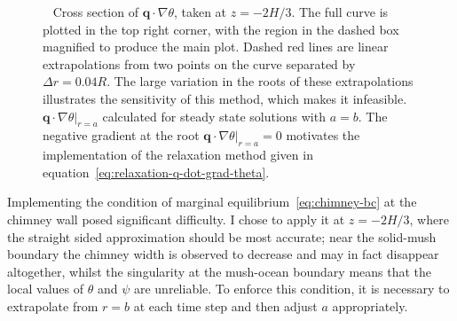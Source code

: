 \documentclass[11pt]{proc}
\begin{document}
\begin{figure}[t!]
\centering
\captionsetup[subfigure]{position=top,singlelinecheck=off,justification=raggedright, aboveskip=-12pt,belowskip=0pt}
\begin{subfigure}[t]{.54\linewidth}
       	\centering
       	 \caption{}
       	\setlength\figureheight{5cm} 
	\setlength\figurewidth{7cm}
	
       	\label{subfig:q-dot-grad-theta}
\end{subfigure}
\quad
\captionsetup[subfigure]{aboveskip=-18pt}
\begin{subfigure}[t]{.42\linewidth}
       	\centering
        	\caption{}
      	\setlength\figureheight{5cm} 
	\setlength\figurewidth{4cm}
	
    	\label{subfig:q-dot-grad-theta-root}
\end{subfigure}

\setlength{\belowcaptionskip}{-7pt} %

\caption{~ Cross section of $\mathbf{q} \cdot \nabla \theta$, taken at $z=-2H/3$. The full curve is plotted in the top right corner, with the region in the dashed box magnified to produce the main plot. Dashed red lines are linear extrapolations from two points on the curve separated by $\Delta r = 0.04R$. The large variation in the roots of these extrapolations illustrates the sensitivity of this method, which makes it infeasible.~ $ \left. \mathbf{q} \cdot \nabla \theta \right|_{r=a}$ calculated for steady state solutions with $a=b$. The negative gradient at the root $ \left. \mathbf{q} \cdot \nabla \theta \right|_{r=a} = 0$ motivates the implementation of the relaxation method given in equation~\eqref{eq:relaxation-q-dot-grad-theta}. }
\label{fig:free-boundary-method}  

\end{figure}

Implementing the condition of marginal equilibrium~\eqref{eq:chimney-bc} at the chimney wall posed significant difficulty. I chose to apply it at $z = - 2H/3$, where the straight sided approximation should be most accurate; near the solid-mush boundary the chimney width is observed to decrease and may in fact disappear altogether, whilst the singularity at the mush-ocean boundary means that the local values of $\theta$ and $\psi$ are unreliable. To enforce this condition, it is necessary to extrapolate from $r=b$ at each time step and then adjust $a$ appropriately. 
\end{document}
